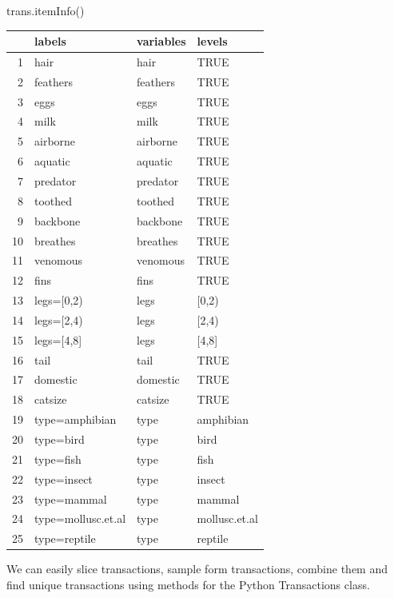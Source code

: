 \documentclass{article}
\newenvironment{Shaded}{}{}
\newcommand{\NormalTok}[1]{#1}
\begin{document}
\begin{Shaded}
\begin{Highlighting}[]
\NormalTok{trans.itemInfo()}
\end{Highlighting}
\end{Shaded}

\begin{longtable}[]{@{}rlll@{}}
\toprule()
& labels & variables & levels \\
\midrule()
\endhead
1 & hair & hair & TRUE \\
2 & feathers & feathers & TRUE \\
3 & eggs & eggs & TRUE \\
4 & milk & milk & TRUE \\
5 & airborne & airborne & TRUE \\
6 & aquatic & aquatic & TRUE \\
7 & predator & predator & TRUE \\
8 & toothed & toothed & TRUE \\
9 & backbone & backbone & TRUE \\
10 & breathes & breathes & TRUE \\
11 & venomous & venomous & TRUE \\
12 & fins & fins & TRUE \\
13 & legs={[}0,2) & legs & {[}0,2) \\
14 & legs={[}2,4) & legs & {[}2,4) \\
15 & legs={[}4,8{]} & legs & {[}4,8{]} \\
16 & tail & tail & TRUE \\
17 & domestic & domestic & TRUE \\
18 & catsize & catsize & TRUE \\
19 & type=amphibian & type & amphibian \\
20 & type=bird & type & bird \\
21 & type=fish & type & fish \\
22 & type=insect & type & insect \\
23 & type=mammal & type & mammal \\
24 & type=mollusc.et.al & type & mollusc.et.al \\
25 & type=reptile & type & reptile \\
\bottomrule()
\end{longtable}

We can easily slice transactions, sample form transactions, combine them
and find unique transactions using methods for the Python Transactions
class.
\end{document}
